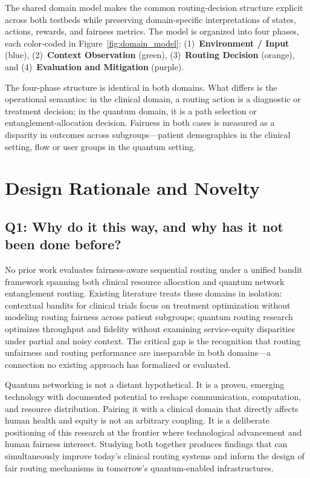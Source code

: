 \documentclass{IEEEtran}
\begin{document}
The shared domain model makes the common routing-decision structure explicit
across both testbeds while preserving domain-specific interpretations of
states, actions, rewards, and fairness metrics. The model is organized into
four phases, each color-coded in Figure~\ref{fig:domain_model}:
(1)~\textcolor{phase1blue}{\textbf{Environment / Input}} (blue),
(2)~\textcolor{phase2green}{\textbf{Context Observation}} (green),
(3)~\textcolor{phase3orange}{\textbf{Routing Decision}} (orange), and
(4)~\textcolor{phase4purple}{\textbf{Evaluation and Mitigation}} (purple).

The four-phase structure is identical in both domains. What differs is the
operational semantics: in the clinical domain, a routing action is a
diagnostic or treatment decision; in the quantum domain, it is a path
selection or entanglement-allocation decision. Fairness in both cases is
measured as a disparity in outcomes across subgroups---patient demographics
in the clinical setting, flow or user groups in the quantum setting.

\section{Design Rationale and Novelty}

\subsection{Q1: Why do it this way, and why has it not been done before?}
No prior work evaluates fairness-aware sequential routing under a unified
bandit framework spanning both clinical resource allocation and quantum
network entanglement routing. Existing literature treats these domains in
isolation: contextual bandits for clinical trials focus on treatment
optimization without modeling routing fairness across patient subgroups;
quantum routing research optimizes throughput and fidelity without examining
service-equity disparities under partial and noisy context. The critical gap
is the recognition that routing unfairness and routing performance are
inseparable in both domains---a connection no existing approach has
formalized or evaluated.

Quantum networking is not a distant hypothetical. It is a proven, emerging
technology with documented potential to reshape communication, computation,
and resource distribution. Pairing it with a clinical domain that directly
affects human health and equity is not an arbitrary coupling. It is a
deliberate positioning of this research at the frontier where technological
advancement and human fairness intersect. Studying both together produces
findings that can simultaneously improve today's clinical routing systems
and inform the design of fair routing mechanisms in tomorrow's
quantum-enabled infrastructures.
\end{document}
